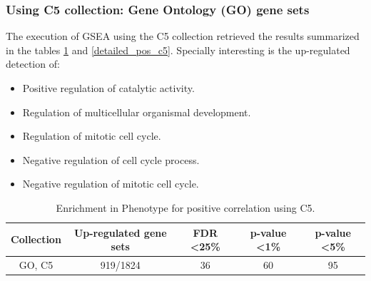 \subsubsection{Using C5 collection: Gene Ontology (GO) gene sets}

The execution of GSEA using the C5 collection retrieved the results summarized in the tables \ref{enr_ph_positive_c5} and \ref{detailed_pos_c5}. Specially interesting is the up-regulated detection of:

\begin{itemize}
    \item Positive regulation of catalytic activity.
    \item Regulation of multicellular organismal development.
    \item Regulation of mitotic cell cycle.
    \item Negative regulation of cell cycle process. 
    \item Negative regulation of mitotic cell cycle.
\end{itemize}


\begin{table}[h!]
    \centering
    \begin{tabular}{ccccc}
    \hline
    Collection      & Up-regulated gene sets & FDR \textless 25\% & p-value \textless 1\% & p-value \textless 5\% \\ \hline
    GO, C5          & 919/1824               & 36                                & 60                                   & 95                                   \\ \hline
    \end{tabular}
    \caption{Enrichment in Phenotype for positive correlation using C5.}
    \label{enr_ph_positive_c5}
    \end{table}


